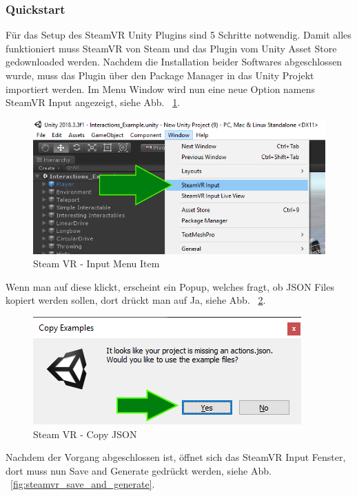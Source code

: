 \begin{itemize}
\subsubsection{Quickstart}
Für das Setup des SteamVR Unity Plugins sind 5 Schritte notwendig.
Damit alles funktioniert muss SteamVR von Steam und das Plugin vom Unity Asset Store gedownloaded werden.
Nachdem die Installation beider Softwares abgeschlossen wurde, muss das Plugin über den Package Manager in das Unity Projekt importiert werden.
Im Menu Window wird nun eine neue Option namens SteamVR Input angezeigt, siehe Abb. ~\ref{fig:steamvr_input_menu_item}.
\begin {figure}
    \centering
    \includegraphics[scale=0.9]{pics/steamVR_Input_MenuItem}
    \caption{Steam VR - Input Menu Item}
    \label{fig:steamvr_input_menu_item}
\end {figure}
Wenn man auf diese klickt, erscheint ein Popup, welches fragt, ob JSON Files kopiert werden sollen, dort drückt man auf Ja, siehe Abb. ~\ref{fig:steamvr_copy_json}.
\begin {figure}
    \centering
    \includegraphics[scale=1]{pics/steamVR_Input_CopyJSON}
    \caption{Steam VR - Copy JSON}
    \label{fig:steamvr_copy_json}
\end {figure}
Nachdem der Vorgang abgeschlossen ist, öffnet sich das SteamVR Input Fenster, dort muss nun Save and Generate gedrückt werden, siehe Abb. ~\ref{fig:steamvr_save_and_generate}.
\begin {figure}

\end{figure}
\end{itemize}
